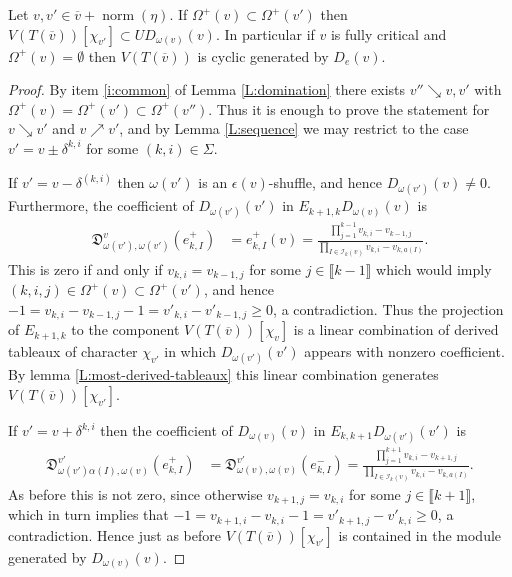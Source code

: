 \documentclass[11pt,fleqn]{article}
\newcommand\DD{\mathfrak D}
\newcommand\I{\mathcal I}
\newcommand\interval[1]{\llbracket #1 \rrbracket}
\DeclareMathOperator\n{norm}
\begin{document}
\begin{Proposition}
\label{P:omega}
Let $v,v' \in \overline v + \n(\eta)$. If $\Omega^+(v) \subset \Omega^+(v')$ 
then $V(T(\overline v))[\chi_{v'}] \subset U D_{\omega(v)}(v)$. In particular
if $v$ is fully critical and $\Omega^+(v) = \emptyset$ then $V(T(\overline v))$
is cyclic generated by $D_e(v)$.
\end{Proposition}
\begin{proof}
By item \ref{i:common} of Lemma \ref{L:domination} there exists $v'' \searrow 
v, v'$ with $\Omega^+(v) = \Omega^+(v') \subset \Omega^+(v'')$. Thus it is 
enough to prove the statement for $v \searrow v'$ and $v \nearrow v'$, and by 
Lemma \ref{L:sequence} we may restrict to the case $v' = v \pm \delta^{k,i}$ 
for some $(k,i) \in \Sigma$. 

If $v' = v - \delta^{(k,i)}$ then $\omega(v')$ is an $\epsilon(v)$-shuffle, 
and hence $D_{\omega(v')}(v) \neq 0$. Furthermore, the coefficient of 
$D_{\omega(v')}(v')$ in $E_{k+1,k} D_{\omega(v)}(v)$ is
\begin{align*}
\DD_{\omega(v'), \omega(v')}^v(e_{k,I}^+)
	&= e_{k,I}^+(v) 
		= \frac{\prod_{j=1}^{k-1} v_{k,i} - v_{k-1,j}}
			{\prod_{I \in \I_k(v)} v_{k,i} - v_{k, a(I)}}.
\end{align*}
This is zero if and only if $v_{k,i} = v_{k-1, j}$ for some $j \in \interval 
{k-1}$ which would imply $(k,i,j) \in \Omega^+(v) \subset \Omega^+(v')$,
and hence $-1 = v_{k,i} - v_{k-1,j} -1 = v'_{k,i} - v'_{k-1,j}  \geq 0$, a
contradiction. Thus the projection of $E_{k+1,k}$ to the component 
$V(T(\overline v))[\chi_v]$ is a linear combination of derived tableaux of
character $\chi_{v'}$ in which $D_{\omega(v')}(v')$ appears with nonzero
coefficient. By lemma \ref{L:most-derived-tableaux} this linear combination
generates $V(T(\overline v))[\chi_{v'}]$.

If $v' = v + \delta^{k,i}$ then the coefficient of $D_{\omega(v)}(v)$ in
$E_{k,k+1} D_{\omega(v')}(v')$ is
\begin{align*}
\DD_{\omega(v')\alpha(I), \omega(v)}^{v'}(e_{k,I}^+)
	&= \DD_{\omega(v),\omega(v)}^{v'}(e_{k,I}^-)
		= \frac{\prod_{j=1}^{k+1} v_{k,i} - v_{k+1,j}}
			{\prod_{I \in \I_k(v)} v_{k,i} - v_{k, a(I)}}.
\end{align*}
As before this is not zero, since otherwise $v_{k+1,j} = v_{k,i}$ for some
$j \in \interval{k+1}$, which in turn implies that $-1 = v_{k+1,i} - v_{k,i}
-1 = v'_{k+1,j} - v'_{k,i} \geq 0$, a contradiction. Hence just as before
$V(T(\overline v))[\chi_{v'}]$ is contained in the module generated by 
$D_{\omega(v)}(v)$.
\end{proof}
\end{document}

